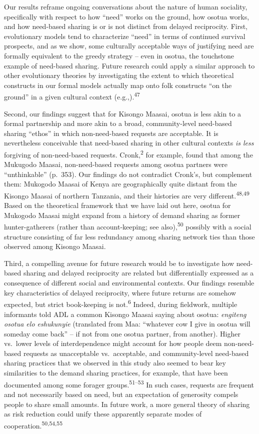 \documentclass[
]{article}
\begin{document}
Our results reframe ongoing conversations about the nature of human sociality, specifically with respect to how ``need'' works on the ground, how osotua works, and how need-based sharing is or is not distinct from delayed reciprocity. First, evolutionary models tend to characterize ``need'' in terms of continued survival prospects, and as we show, some culturally acceptable ways of justifying need are formally equivalent to the greedy strategy -- even in osotua, the touchstone example of need-based sharing. Future research could apply a similar approach to other evolutionary theories by investigating the extent to which theoretical constructs in our formal models actually map onto folk constructs ``on the ground'' in a given cultural context (e.g.,).\textsuperscript{47}

Second, our findings suggest that for Kisongo Maasai, osotua is less akin to a formal partnership and more akin to a broad, community-level need-based sharing ``ethos'' in which non-need-based requests are acceptable. It is nevertheless conceivable that need-based sharing in other cultural contexts \emph{is less} forgiving of non-need-based requests. Cronk,\textsuperscript{2} for example, found that among the Mukugodo Maasai, non-need-based requests among osotua partners were ``unthinkable'' (p.~353). Our findings do not contradict Cronk's, but complement them: Mukogodo Maasai of Kenya are geographically quite distant from the Kisongo Maasai of northern Tanzania, and their histories are very different.\textsuperscript{48,49} Based on the theoretical framework that we have laid out here, osotua for Mukogodo Maasai might expand from a history of demand sharing as former hunter-gatherers (rather than account-keeping; see also),\textsuperscript{50} possibly with a social structure consisting of far less redundancy among sharing network ties than those observed among Kisongo Maasai.

Third, a compelling avenue for future research would be to investigate how need-based sharing and delayed reciprocity are related but differentially expressed as a consequence of different social and environmental contexts. Our findings resemble key characteristics of delayed reciprocity, where future returns are somehow expected, but strict book-keeping is not.\textsuperscript{6} Indeed, during fieldwork, multiple informants told ADL a common Kisongo Maasai saying about osotua: \emph{engiteng osotua elo eshukunyie} (translated from Maa: ``whatever cow I give in osotua will someday come back'' -- if not from one osotua partner, from another). Higher vs.~lower levels of interdependence might account for how people deem non-need-based requests as unacceptable vs.~acceptable, and community-level need-based sharing practices that we observed in this study also seemed to bear key similarities to the demand sharing practices, for example, that have been documented among some forager groups.\textsuperscript{51--53} In such cases, requests are frequent and not necessarily based on need, but an expectation of generosity compels people to share small amounts. In future work, a more general theory of sharing as risk reduction could unify these apparently separate modes of cooperation.\textsuperscript{50,54,55}
\end{document}
